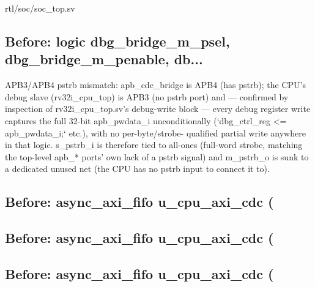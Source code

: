 \begin{relocated}{rtl/soc/soc_top.sv}
\subsection*{Before: logic        dbg\_bridge\_m\_psel, dbg\_bridge\_m\_penable, db...}

\begin{textblock}
APB3/APB4 pstrb mismatch: apb_cdc_bridge is APB4 (has pstrb); the CPU's
debug slave (rv32i_cpu_top) is APB3 (no pstrb port) and — confirmed by
inspection of rv32i_cpu_top.sv's debug-write block — every debug
register write captures the full 32-bit apb_pwdata_i unconditionally
(`dbg_ctrl_reg <= apb_pwdata_i;` etc.), with no per-byte/strobe-
qualified partial write anywhere in that logic. s_pstrb_i is therefore
tied to all-ones (full-word strobe, matching the top-level apb_* ports'
own lack of a pstrb signal) and m_pstrb_o is sunk to a dedicated unused
net (the CPU has no pstrb input to connect it to).
\end{textblock}

\subsection*{Before: async\_axi\_fifo u\_cpu\_axi\_cdc (}


\subsection*{Before: async\_axi\_fifo u\_cpu\_axi\_cdc (}


\subsection*{Before: async\_axi\_fifo u\_cpu\_axi\_cdc (}


\end{relocated}
